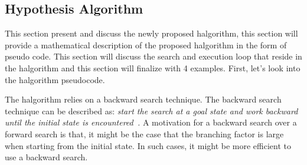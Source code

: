 \subsection{Hypothesis Algorithm}%
\label{subsec:halgorithm}
This section present and discuss the newly proposed \ac{halgorithm}, this section will provide a mathematical description of the proposed \ac{halgorithm} in the form of pseudo code. This section will discuss the search and execution loop that reside in the \ac{halgorithm} and this section will finalize with 4 examples. First, let's look into the \ac{halgorithm} pseudocode.\bs

The \ac{halgorithm} relies on a backward search technique. The backward search technique can be described as: \textit{start the search at a goal state and work backward until the initial state is encountered~\cite{lavalle_planning_2006}.} A motivation for a backward search over a forward search is that, it might be the case that the branching factor is large when starting from the initial state. In such cases, it might be more efficient to use a backward search.

